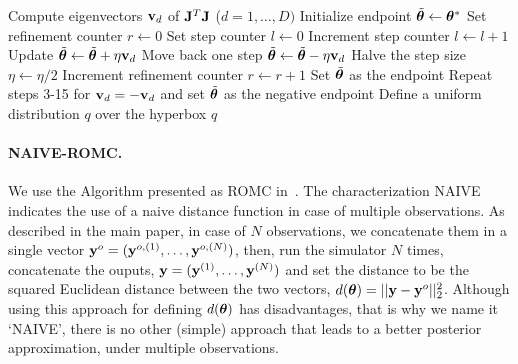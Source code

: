 \begin{algorithm}[!ht]
  \caption{Hyperbox Computation \newline
    \textit{Input:} Optimal point \(\thb^*\), distance function \(d(\thb)\), Jacobian \(\jac\) at \(\thb^*\) \newline
    \textit{Parameters:} Step size \(\eta\), number of refinements \(R\), number of steps \(L\), distance threshold \(\epsilon\)}
  \label{alg:region_construction}
  \begin{algorithmic}[1]
    \State Compute eigenvectors \(\mathbf{v}_d\) of \(\mathbf{J}^T\mathbf{J}\) {\scriptsize (\(d = 1,\ldots,D)\)}
      \State Initialize endpoint \(\Tilde{\boldsymbol{\theta}} \gets \boldsymbol{\theta}^*\)
      \State Set refinement counter \(r \gets 0\)
      \Repeat{}
        \State Set step counter \(l \gets 0\)
        \Repeat{}
          \State Increment step counter \(l \gets l + 1\)
          \State Update \(\Tilde{\boldsymbol{\theta}} \gets \Tilde{\boldsymbol{\theta}} + \eta \mathbf{v}_d\)
        \State Move back one step \(\Tilde{\boldsymbol{\theta}} \gets \Tilde{\boldsymbol{\theta}} - \eta \mathbf{v}_d\)
        \State Halve the step size \(\eta \gets \eta/2\)
        \State Increment refinement counter \(r \gets r + 1\)
      \State Set \(\Tilde{\boldsymbol{\theta}}\) as the endpoint
      \State Repeat steps 3-15 for \(\mathbf{v}_d = - \mathbf{v}_d\) and set \(\Tilde{\boldsymbol{\theta}}\) as the negative endpoint
    \EndFor
    \State Define a uniform distribution \(q\) over the hyperbox
    \State \Return \(q\)
  \end{algorithmic}
\end{algorithm}


\paragraph{NAIVE-ROMC.}

We use the Algorithm presented as ROMC in~\cite{ikonomov2020robust}. The characterization NAIVE indicates the use of a naive distance function in case of multiple observations. As described in the main paper, in case of $N$ observations, we concatenate them in a single vector $\mathbf{y}^o = (\mathbf{y}^{o, (1)}, \ldots, \mathbf{y}^{o, (N)})$, then, run the simulator $N$ times, concatenate the ouputs, $\mathbf{y} = (\mathbf{y}^{(1)}, \ldots, \mathbf{y}^{(N)})$ and set the distance to be the squared Euclidean distance between the two vectors, $d(\boldsymbol{\theta}) = ||\mathbf{y}-\mathbf{y}^o||_2^2$.
Although using this approach for defining $d(\thb)$ has disadvantages, that is why we name it `NAIVE', there is no other (simple) approach that leads to a better posterior approximation, under multiple observations.

